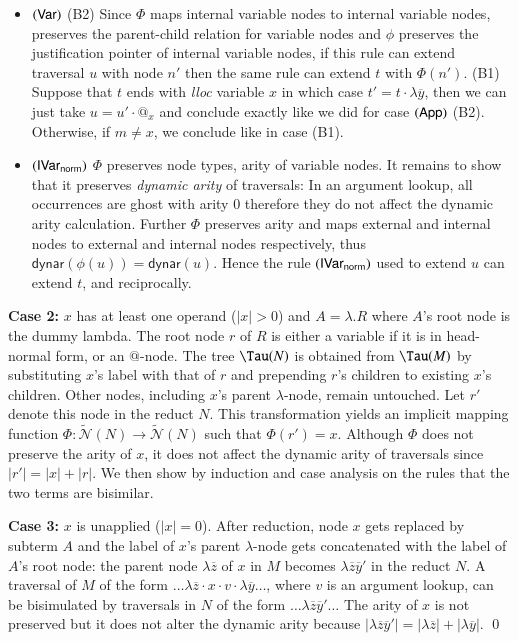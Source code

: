 \documentclass{elsarticle}
\def\endproofatend{\end{proof}}
\theoremstyle{plain}
\theoremstyle{definition}
\newcommand\Nodes{\mathcal{N}}%
\newcommand\ExtendedNodes{\tilde{\Nodes}}
\newcommand{\normalizing}{{\sf norm}}
\newcommand{\ctree}{\Tau} %
\newcommand\dynar{\textsf{dynar}} %
\begin{document}
\begin{itemize}[itemindent=0.1em, leftmargin=0.4em]
    \item $\mathbf{({\sf Var})}$
    (B2) Since $\Phi$ maps internal variable nodes to internal
    variable nodes, preserves the parent-child relation for variable nodes and $\phi$ preserves the justification pointer of internal variable nodes, if this rule can extend traversal $u$ with node $n'$ then the same rule can extend $t$ with $\Phi(n')$.
%
    (B1) Suppose that $t$ ends with \emph{lloc} variable $x$ in which case $t' = t \cdot \lambda\overline{y}$, then
        we can just take $u = u' \cdot @_x$ and conclude exactly like we did for case $\mathbf{({\sf App})}$ (B2).
    Otherwise, if $m\neq x$, we conclude like in case (B1).

    \item $\rulename{IVar_\normalizing}$ $\Phi$ preserves node types, arity of variable nodes. It remains to show that it preserves \emph{dynamic arity} of traversals: In an argument lookup, all occurrences are ghost with arity $0$ therefore they do not affect the dynamic arity calculation.
    Further $\Phi$ preserves arity and maps external and internal nodes to external and internal nodes respectively, thus $\dynar(\phi(u))=\dynar(u)$.
    Hence the rule $\rulename{IVar_\normalizing}$ used to extend $u$ can extend $t$, and reciprocally.
\end{itemize}
\fi

{\bf Case 2:} $x$ has at least one operand ($|x|>0$) and $A = \lambda. R$ where $A$'s root node is the dummy lambda.
The root node $r$ of $R$ is either a variable if it is in head-normal form, or an $@$-node.
The tree $\ctree(N)$ is obtained from $\ctree(M)$
by substituting $x$'s label with that of $r$ and prepending $r$'s children to existing $x$'s children. Other nodes, including $x$'s parent $\lambda$-node, remain untouched. Let $r'$ denote this node in the reduct $N$.
This transformation yields an implicit mapping function $\Phi : \ExtendedNodes(N)\rightarrow \ExtendedNodes(N)$ such that $\Phi(r') = x$.
Although $\Phi$ does not preserve the arity of $x$, it does not affect the dynamic arity of traversals since $|r'| = |x| + |r|$.
We then show by induction and case analysis on the rules that the two terms are bisimilar.

{\bf Case 3:} $x$ is unapplied ($|x|=0$).
%
After reduction, node $x$ gets replaced by subterm $A$ and the label of $x$'s parent $\lambda$-node gets concatenated with the label of $A$'s root node:
the parent node $\lambda\overline{z}$ of $x$ in $M$ becomes $\lambda\overline{z}\overline{y}'$ in the reduct $N$.
A traversal of $M$ of the form $\ldots \lambda\overline{z} \cdot x \cdot v \cdot \lambda\overline{y} \ldots$, where $v$ is an argument lookup, can be bisimulated by traversals in $N$ of the form $\ldots \lambda\overline{z}\overline{y}' \ldots$ The arity of $x$ is not preserved but it does not alter the dynamic arity because $|\lambda{\overline{z} \overline{y}'}| =
 |\lambda{\overline{z}}| +  |\lambda{\overline{y}}|$.
\qed
\end{document}
